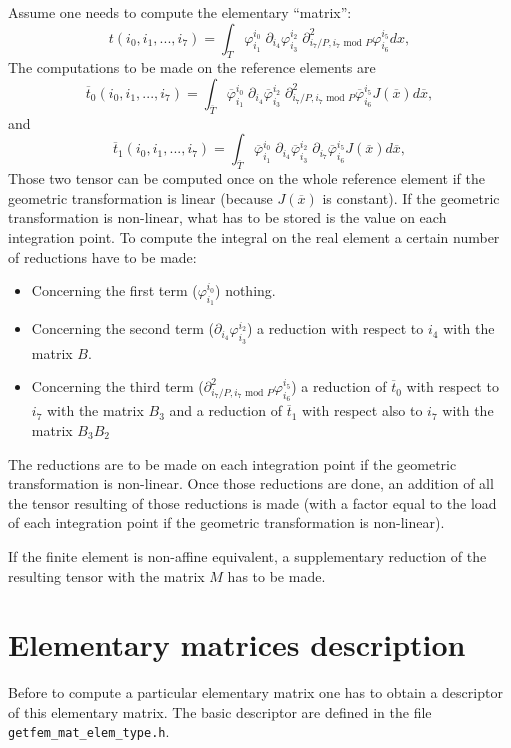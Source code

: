 \documentclass[11pt,a4paper]{article}
\begin{document}
Assume one needs to compute the elementary ``matrix'':
$$ t(i_0, i_1, ..., i_7) = \int_{T} \varphi_{i_1}^{i_0}\; \partial_{i_4} \varphi_{i_3}^{i_2}\; \partial^2_{i_7 / P, i_7 \mbox{ mod } P} \varphi_{i_6}^{i_5} dx, $$ 
The computations to be made on the reference elements are
$$ \overline{t}_0(i_0, i_1, ..., i_7) = \int_{\overline{T}} \overline{\varphi}_{i_1}^{i_0}\; \partial_{i_4} \overline{\varphi}_{i_3}^{i_2}\; \partial^2_{i_7 / P, i_7 \mbox{ mod } P} \overline{\varphi}_{i_6}^{i_5}  J(\overline{x}) d\overline{x}, $$
and
$$ \overline{t}_1(i_0, i_1, ..., i_7) = \int_{\overline{T}} \overline{\varphi}_{i_1}^{i_0}\; \partial_{i_4} \overline{\varphi}_{i_3}^{i_2}\; \partial_{i_7} \overline{\varphi}_{i_6}^{i_5}  J(\overline{x}) d\overline{x}, $$
Those two tensor can be computed once on the whole reference element if the geometric transformation is linear (because $J(\overline{x})$ is constant). If the geometric transformation is non-linear, what has to be stored is the value on each integration point. To compute the integral on the real element a certain number of reductions have to be made:
\begin{itemize}
   \item Concerning the first term ($\varphi_{i_1}^{i_0}$) nothing.
   \item Concerning the second term ($\partial_{i_4} \varphi_{i_3}^{i_2}$) a reduction with respect to $i_4$ with the matrix $B$.
   \item Concerning the third term ($\partial^2_{i_7 / P, i_7 \mbox{ mod } P} \varphi_{i_6}^{i_5}$) a reduction of $\overline{t}_0$ with respect to $i_7$ with the matrix $B_3$ and a reduction of $\overline{t}_1$ with respect also to $i_7$ with the matrix $B_3B_2$
\end{itemize}
The reductions are to be made on each integration point if the geometric transformation is non-linear. Once those reductions are done, an addition of all the tensor resulting of those reductions is made (with a factor equal to the load of each integration point if the geometric transformation is non-linear).

If the finite element is non-affine equivalent, a supplementary reduction of the resulting tensor with the matrix $M$ has to be made.

\section{Elementary matrices description}

Before to compute a particular elementary matrix one has to obtain a descriptor  of this elementary matrix. The basic descriptor are defined in the file {\tt getfem\_mat\_elem\_type.h}. 
\end{document}
